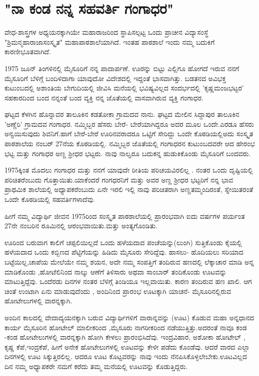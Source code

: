 \chapter{"ನಾ ಕಂಡ ನನ್ನ ಸಹವರ್ತಿ ಗಂಗಾಧರ"}

\begin{center}
\end{center}

ವೇಧ-ಶಾಸ್ತ್ರಗಳ ಅಧ್ಯಯನಕ್ಕಾಗಿಯೇ ಮಹಾರಾಜರಿಂದ ಸ್ಥಾಪಿಸಲ್ಪಟ್ಟ ಒಂದು ಪ್ರಾಚೀನ ವಿದ್ಯಾಸಂಸ್ಥೆ   "ಶ್ರಿಮನ್ಮಹಾರಾಜಾಸಂಸ್ಕೃತ" ಮಹಾಪಾಠಶಾಲೆಯಾಗಿದೆ.  ಇಂತಹ ಪಾಠಶಾಲೆ ಇಂದು ನಮ್ಮ ಬದುಕಿಗೆ ಕಾರಣೀಭೂತವಾಗಿದೆ. 

1975 ಜೂನ್ ತಿಂಗಳಿನಲ್ಲಿ ಮೈಸೂರಿಗೆ ನನ್ನ ಪಾದಾರ್ಪಣೆ. ಊರನ್ನು ಬಿಟ್ಟು ಎಲ್ಲಿಗೂ ಹೋಗದೆ ಇರುವ ನನಗೆ ಮೈಸೂರಿಗೆ ಬೆಳಿಗ್ಗೆ ಬಂದಿಳಿದಾಗಾ ಯಾವುದೋ ವಿದೇಶದಲ್ಲಿ ಇದ್ದಂತೆ ಭಾಸವಾಗಿತ್ತು. ಬಡತನದ ಅವಿಭಕ್ತ ಕುಟುಂಬದಲ್ಲಿ  ಅಶಾಂತಿಯ ಬೇಗುದಿಯಲ್ಲಿ ಜೀವಿಸಿ ಮನೆಯಲ್ಲಿ ಭವಿಷ್ಯವಿಲ್ಲದ ಸಂದರ್ಭದಲ್ಲಿ 'ಕೃಷ್ಣಮಂಜಭಟ್ಟರ' ಸಹಕಾರದಿಂದ ಬಂದ ನನ್ನಂತೆ  ಬಂದ ವ್ಯಕ್ತಿ ನನ್ನ ಜೊತೆಯಲ್ಲಿ ವಾಸವಾಗಿರುವ ವ್ಯಕ್ತಿ ಗಂಗಾಧರ.

ಘಟ್ಟದ ಕೆಳಗಿನ ಹೊನ್ನಾವರ ತಾಲೂಕಿನ ಕಡತೋಕಾ ಗ್ರಾಮದವ ನಾನು. ಘಟ್ಟದ ಮೇಲಿನ ಸಿದ್ದಾಪುರ ತಾಲೂಕಿನ 'ಅಣ್ಣೆರಿ' ಗ್ರಾಮದವ ಗಂಗಾಧರ. ನಮ್ಮಿಬ್ಬರ ಹೆಸರು ಬೇರೆ- ಬೇರೆಯಾಗಿದ್ದರೂ ಅದರ ಮೂಲ ಒಂದೇ.ಎರಡೂ ಹೆಸರು   ಅನ್ವಯಿಸುವುದು ಶಿವನಿಗೆ.ಹಾಗೆ ಬೇರೆ-ಬೇರೆ  ಊರಿನವರಾದರೂ ಒಟ್ಟಿಗೆ ಸೇರಿದ್ದು ಒಂದೇ ಕೊಠಡಿಯಲ್ಲಿಅದು ಸಂಸ್ಕೃತ ಪಾಠಶಾಲೆಯ  ನಂಬರ್ 27ನೆಯ ಕೊಠಡಿಯಲ್ಲಿ. ನಮ್ಮಿಬ್ಬರ ಜೊತೆಯಲ್ಲಿ ಗಂಗಾಧರನ ಕುಟುಂಬದವರೇ ಆದ ಹೇರಂಭ ಭಟ್ಟ ಮತ್ತು ಗಂಗಾಧರ ಅಣ್ಣ ಶ್ರೀಧರ ಭಟ್ಟರು. ನಾವು ನಾಲ್ವರೂ ಬದುಕನ್ನ ಹುಡುಕಿಕೊಂಡು ಮೈಸೂರಿಗೆ ಬಂದವರು. 

1975ಕ್ಕಿಂತ  ಮೊದಲು ಗಂಗಾಧರ ಮತ್ತು ನನಗೆ ಯಾವುದೇ ರೀತಿಯ ಪರಿಚಯವಿರಲಿಲ್ಲ . ನಂತರ ಒಂದು ದೃಷ್ಟಿಯಲ್ಲಿ ಪರಿಚಿತರೆಂಬುದು ಗೊತ್ತಾಯಿತು.ಯಾಕೆಂದರೆ  ಗಂಗಧರನಿಗೆ ಮತ್ತು ಅವರ ಅಣ್ಣ ಶ್ರೀಧರ ಭಟ್ಟರಿಗೆ  ನನ್ನ ಭಾವ ಪ್ರಾಥಮಿಕ ಶಾಲೆಯಲ್ಲಿ ಅಧ್ಯಾಪಕರೆಂಬುದು  ಏನೇ ಇರಲಿ ಇಲ್ಲಿ ನಾವು ಪರಿಚಿತರಾಗಿ ಅಣ್ಣತಮ್ಮಂದಿರಂತೆ, ಸ್ನೇಯಿತರಂತೆ ಒಂದೇ ಕೊಠಡಿಯಲ್ಲಿ ಸಹವರ್ತಿಗಳಾದೆವು. 

ಹೀಗೆ ನಮ್ಮ ವಿದ್ಯಾರ್ಥಿ ಜೀವನ 1975ರಿಂದ ಸಂಸ್ಕೃತ ಪಾಠಶಾಲೆಯಲ್ಲಿ ಪ್ರಾರಂಭವಾಗಿ ಐದು ವರ್ಷಗಳ ಪರ್ಯಂತ 27ನೇ ನಂಬರಿನ ರೂಮಿನಲ್ಲಿ ಆರಂಭವಾಯಿತು.ಮತ್ತು ಅಂತ್ಯಗೊಂಡಿತು. 

ಊರಿಂದ ಬರುವಾಗ ಕಾಲಿಗೆ ಚಪ್ಪಲಿಯಿಲ್ಲದೆ ಒಂದು ಹಳೆಯದಾದ ಪಂಚೆಯನ್ನು(ಲುಂಗಿ) ಸುತ್ತಿಕೊಂಡು ಕೈಯಲ್ಲಿ ಹಳೆಯದಾದ ಒಂದು ಕಬ್ಬಿಣದ ಪೆಟ್ಟಿಗೆಯನ್ನು ಹಿಡಿದು ಮೈಸೂರು ಸೇರಿದ್ದೆವು. ಹಾಸಲು- ಹೊದಿಯಲು ಸರಿಯಾದ ಬಟ್ಟೆಯಿಲ್ಲ,ಚಾಪೆಯ ಮೇಲೆಯೇ ನಮ್ಮ ಶಯನ, ಅದೇ ನಮ್ಮ ಸಂಪತ್ತಿಗೆ ತಂದಿರುವ ಹಣದಲ್ಲಿ ಲೆಕ್ಕಾಚಾರ ಮಾಡಿ ಅನ್ನ ಮಾಡಿಕೊಂಡು ,ಹೋಟೆಲಿನಿಂದ ನಾಲ್ಕು ಆಣೆಗೆ ತಿಳಿಸಾರು  ಅಥವಾ ಸಾಂಬಾರ್ ತಂದಿಕೊಂಡು ಊಟವನ್ನು ಮಾಟುತ್ತಿದ್ದೆವು. ಒಂದೆರಡು ದಿನಗಳ ನಂತರ ಬೆಳಿಗ್ಗೆ ತಿಂಡಿಯೂ ಇಲ್ಲವಾಯಿತು. ಕಾರಣ ತಂದಿರುವ ಹಣ ಖಾಲಿ. ಆಗ ಚಿಂತೆ ಉಂಟಾಗಿ ಏನು ಮಾಡುವುದೆಂದು , ಅಂದಿನಿಂದ ಪ್ರಾರಂಭ ಊಟಕ್ಕಾಗಿ ಯಾಚನೆ- ಮೈಸೂರಿನಲ್ಲಿರುವ ಹೋಟೇಲುಗಳಲ್ಲಿ ವಾರನ್ನಕ್ಕಾಗಿ.

ಅಂದಿನ ಕಾಲದಲ್ಲಿ ವೇದಾದ್ಯಯನಕ್ಕಾಗಿ ಬರುವ ವಿದ್ಯಾರ್ಥಿಗಳಿಗೆ ವಾರಾನ್ನವನ್ನು (ಊಟ) ಕೊಡುವ ಮಹಾ ಅನ್ನಧಾನದ ಕಾರ್ಯ ಮೈಸೂರಿನ ಹೋಟೇಲ್ ಮಾಲೀಕರಿಂದ ,ಮೈಸೂರು ನಾಗರೀಕರಿಂದ ನಡೆಯುತ್ತಿತ್ತು.ಅದರಂತೆ ನಾವೂ ಕಂಡ -ಕಂಡ  ಹೋಟೇಲುಗಳಲ್ಲಿ ವಾರನ್ನಕ್ಕಾಗಿ ಹೋಗಿ ಕೇಳಲು ಪ್ರಾರಂಭಿಸಿದೆವು. ಇಂದ್ರವಿಹಾರ, ಅಶೋಕಾ ಹೋಟೇಲ್ , ಕೃಷ್ಣ ಕೆಪೆ,ಇಂದ್ರಕೆಪೆ, ಹೀಗೆ ಅನೇಕ ಹೋಟೇಲುಗಳಲ್ಲಿ ಊಟವನ್ನು ಕೇಳೀ ಪಡೆದು ಕೊಂಡೆವು. ಆದರೆ ವಾರದ ಎಲ್ಲಾ ದಿನಗಳಲ್ಲಿ ಊಟ ಸಿಕ್ಕುತ್ತಿರಲಿಲ್ಲ. ಆದರೂ ಊಟ ಕೊಟ್ಟವರನ್ನು ನಾವು ಇಂದು ನೆನಪಿಸಿಕೊಳ್ಳಲೇಬೇಕು.ಊಟವಿಲ್ಲದ ದಿನ ನಮ್ಮ ಅಧ್ಯಾಪಕರೇ ನಮಗೆ ಕರೆದು ತಮ್ಮ ಮನೆಯಲ್ಲಿ ಊಟವನ್ನು ಕೊಡುತ್ತಿದ್ದರು. 

